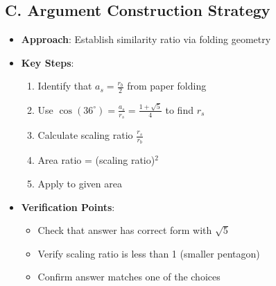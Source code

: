 \documentclass[12pt]{article}
\begin{document}
\begin{strategicbox}
\subsection*{C. Argument Construction Strategy}
\begin{itemize}[leftmargin=*]
    \item \textbf{Approach}: Establish similarity ratio via folding geometry
    \item \textbf{Key Steps}:
    \begin{enumerate}
        \item Identify that $a_s = \frac{r_b}{2}$ from paper folding
        \item Use $\cos(36^\circ) = \frac{a_s}{r_s} = \frac{1+\sqrt{5}}{4}$ to find $r_s$
        \item Calculate scaling ratio $\frac{r_s}{r_b}$
        \item Area ratio = (scaling ratio)$^2$
        \item Apply to given area
    \end{enumerate}
    \item \textbf{Verification Points}: 
    \begin{itemize}
        \item Check that answer has correct form with $\sqrt{5}$
        \item Verify scaling ratio is less than 1 (smaller pentagon)
        \item Confirm answer matches one of the choices
    \end{itemize}
\end{itemize}


\end{strategicbox}
\end{document}
